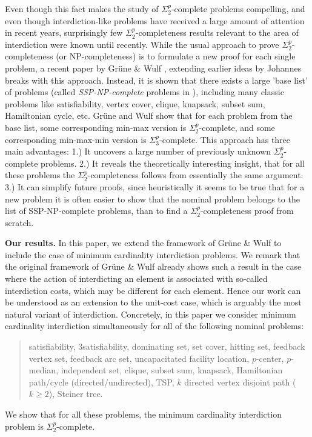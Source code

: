 Even though this fact makes the study of $\Sigma^p_2$-complete problems compelling, and even though interdiction-like problems have received a large amount of attention in recent years, 
surprisingly few $\Sigma^p_2$-completeness results relevant to the area of interdiction were known until recently. 
While the usual approach to prove $\Sigma^p_2$-completeness (or NP-completeness) is to formulate a new proof for each single problem,
a recent paper by Grüne \& Wulf \cite{gruene2024completeness}, extending earlier ideas by Johannes \cite{johannes2011new} breaks with this approach. 
Instead, it is shown that there exists a large 'base list' of problems (called \emph{SSP-NP-complete} problems in \cite{gruene2024completeness}), including many classic problems like satisfiability, vertex cover, clique, knapsack, subset sum, Hamiltonian cycle, etc.
Grüne and Wulf show that for each problem from the base list, some corresponding min-max version is $\Sigma^p_2$-complete, and some corresponding min-max-min version is $\Sigma^p_3$-complete. 
This approach has three main advantages: 
1.) It uncovers a large number of previously unknown $\Sigma^p_2$-complete problems. 
2.) It reveals the theoretically interesting insight, that for all these problems the $\Sigma^p_2$-completeness follows from essentially the same argument. 
3.) It can simplify future proofs, since heuristically it seems to be true that for a new problem it is often easier to show that the nominal problem belongs to the list of SSP-NP-complete problems, than to find a $\Sigma^p_2$-completeness proof from scratch.

\textbf{Our results.}
In this paper, we extend the framework of Grüne \& Wulf \cite{gruene2024completeness} to include the case of minimum cardinality interdiction problems. 
We remark that the original framework of Grüne \& Wulf already shows such a result in the case where the action of interdicting an element is associated with so-called interdiction costs, which may be different for each element. 
Hence our work can be understood as an extension to the unit-cost case, which is arguably the most natural variant of interdiction.
Concretely, in this paper we consider minimum cardinality interdiction simultaneously for all of the following nominal problems:
\begin{quote}
    satisfiability,
    3satisfiability,
    dominating set,
    set cover,
    hitting set,
    feedback vertex set,
    feedback arc set,
    uncapacitated facility location,
    $p$-center,
    $p$-median,
    independent set,
    clique,
    subset sum,
    knapsack,
    Hamiltonian path/cycle (directed/undirected),
    TSP,
    $k$ directed vertex disjoint path ($k \geq 2$),
    Steiner tree.
\end{quote}
We show that for all these problems, the minimum cardinality interdiction problem is $\Sigma^p_2$-complete.

